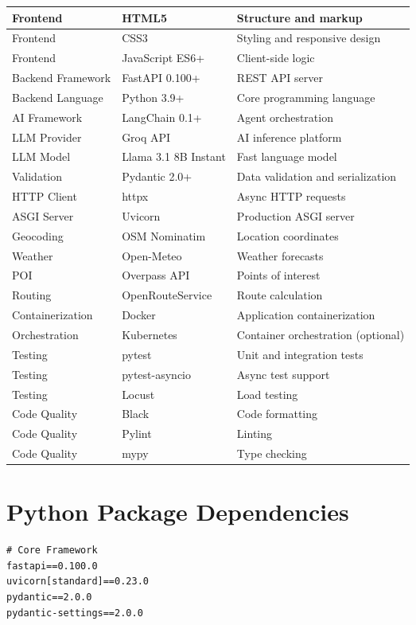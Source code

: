 \documentclass[12pt,a4paper]{report}
\begin{document}
\begin{figure}[H]
\begin{plantuml}
\begin{figure}[H]
\begin{plantuml}
\begin{longtable}{|l|l|p{7cm}|}
Frontend & HTML5 & Structure and markup \\
\hline
Frontend & CSS3 & Styling and responsive design \\
\hline
Frontend & JavaScript ES6+ & Client-side logic \\
\hline
Backend Framework & FastAPI 0.100+ & REST API server \\
\hline
Backend Language & Python 3.9+ & Core programming language \\
\hline
AI Framework & LangChain 0.1+ & Agent orchestration \\
\hline
LLM Provider & Groq API & AI inference platform \\
\hline
LLM Model & Llama 3.1 8B Instant & Fast language model \\
\hline
Validation & Pydantic 2.0+ & Data validation and serialization \\
\hline
HTTP Client & httpx & Async HTTP requests \\
\hline
ASGI Server & Uvicorn & Production ASGI server \\
\hline
Geocoding & OSM Nominatim & Location coordinates \\
\hline
Weather & Open-Meteo & Weather forecasts \\
\hline
POI & Overpass API & Points of interest \\
\hline
Routing & OpenRouteService & Route calculation \\
\hline
Containerization & Docker & Application containerization \\
\hline
Orchestration & Kubernetes & Container orchestration (optional) \\
\hline
Testing & pytest & Unit and integration tests \\
\hline
Testing & pytest-asyncio & Async test support \\
\hline
Testing & Locust & Load testing \\
\hline
Code Quality & Black & Code formatting \\
\hline
Code Quality & Pylint & Linting \\
\hline
Code Quality & mypy & Type checking \\
\hline
\end{longtable}

\section{Python Package Dependencies}

\begin{lstlisting}[style=bashStyle, caption={requirements.txt}]
# Core Framework
fastapi==0.100.0
uvicorn[standard]==0.23.0
pydantic==2.0.0
pydantic-settings==2.0.0


\end{lstlisting}
\end{plantuml}
\end{figure}
\end{plantuml}
\end{figure}
\end{document}
